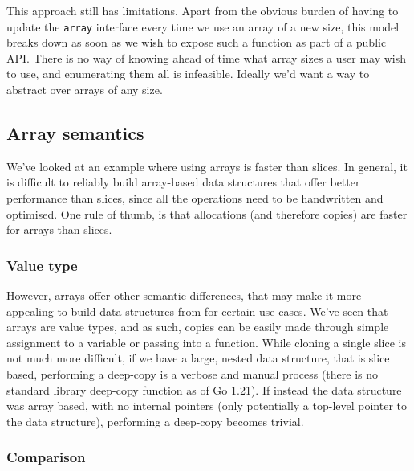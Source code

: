 
This approach still has limitations. Apart from the obvious burden of having to
update the \texttt{array} interface every time we use an array of a new size,
this model breaks down as soon as we wish to expose such a function as part of a
public API. There is no way of knowing ahead of time what array sizes a user may
wish to use, and enumerating them all is infeasible. Ideally we'd want a way to
abstract over arrays of any size.


\subsection{Array semantics}


We've looked at an example where using arrays is faster than slices. In general,
it is difficult to reliably build array-based data structures that offer better
performance than slices, since all the operations need to be handwritten and
optimised. One rule of thumb, is that allocations (and therefore copies) are
faster for arrays than slices.

\subsubsection{Value type}

However, arrays offer other semantic differences, that may make it more
appealing to build data structures from for certain use cases. We've seen that
arrays are value types, and as such, copies can be easily made through simple
assignment to a variable or passing into a function. While cloning a single
slice is not much more difficult, if we have a large, nested data structure,
that is slice based, performing a deep-copy is a verbose and manual process
(there is no standard library deep-copy function as of Go 1.21). If instead the
data structure was array based, with no internal pointers (only potentially a
top-level pointer to the data structure), performing a deep-copy becomes
trivial.

\subsubsection{Comparison}

